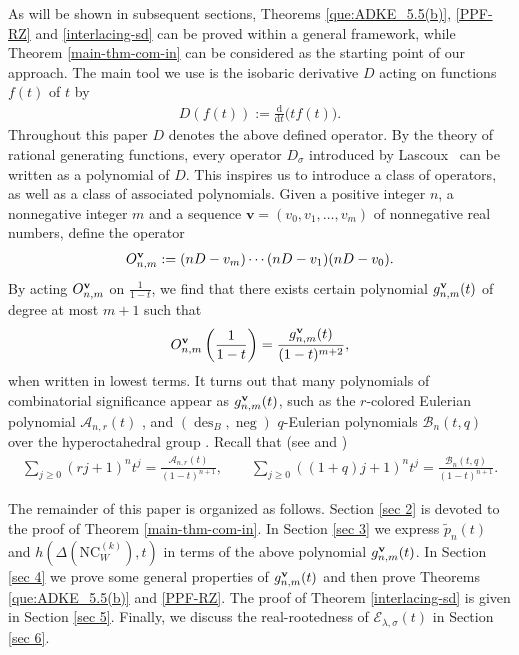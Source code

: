 \documentclass[12pt]{article}
\newcommand{\PPP}{\tilde{p}}
\newcommand{\NC}{\mathrm{NC}}
\numberwithin{equation}{section}
\begin{document}
As will be shown in subsequent sections, Theorems \ref{que:ADKE_5.5(b)}, \ref{PPF-RZ} and \ref{interlacing-sd} can be proved within a general framework, while Theorem \ref{main-thm-com-in} can be considered as the starting point of our approach. 
The main tool we use is the isobaric derivative $D$ acting on functions $f(t)$ of $t$ by 
\begin{align*}
D(f(t)):=\frac{\text{d}}{\text{d}t}\big(tf(t)\big).    
\end{align*}
Throughout this paper $D$ denotes the above defined operator. 
By the theory of rational generating functions, every operator $D_\sigma$ introduced by Lascoux~\cite{Lascoux-2016} 
can be written as a polynomial of $D$. This inspires us to introduce a class of operators, as well as a class of associated polynomials.  
Given a positive integer $n$, a nonnegative integer $m$ and a sequence $\mathbf{v} =(v_0,v_1,\ldots, v_{m})$ of nonnegative real numbers, 
define the operator
\begin{align}\label{eq:defi-O_nk}
O^{\bf{v}}_{n,m}:=(nD - v_m) \cdots(nD - v_1)(nD-v_0).
\end{align}
By acting $O^{\bf{v}}_{n,m}$ on $\frac{1}{1-t}$, we find that there exists certain polynomial $g^{\bf{v}}_{n,m}(t)$ of degree at most $m+1$ such that
\begin{align}\label{eq:defi-fnk(x)}
O^{\bf{v}}_{n,m} \left( \frac{1}{1 - t} \right)=
\frac{g^{\bf{v}}_{n,m}(t)}{(1 - t)^{m + 2}},
\end{align}
when written in lowest terms.
It turns out that many polynomials of combinatorial significance  appear as $g^{\bf{v}}_{n,m}(t)$, such as the $r$-colored Eulerian polynomial $\mathcal{A}_{n,r}(t)$ \cite{Steingrimsson-1994}, and $(\operatorname{des}_B,\operatorname{neg})$ $q$-Eulerian polynomials $\mathcal{B}_n(t,q)$ over the hyperoctahedral group \cite{Brenti-1994}.
Recall that (see \cite[Eq. (12)]{Brenti-1994} and \cite[Theorem 17]{Steingrimsson-1994}) 
\begin{align*}
\sum_{j\ge0}(rj+1)^n t^j=\frac{\mathcal{A}_{n,r}(t)}{(1-t)^{n+1}},\qquad\sum_{j\ge0}((1+q)j+1)^n t^j=\frac{\mathcal{B}_n(t,q)}{(1-t)^{n+1}}.
\end{align*}

The remainder of this paper is organized as follows. Section \ref{sec 2} is devoted to the proof of Theorem \ref{main-thm-com-in}. 
In Section \ref{sec 3} we express $\PPP_n(t)$ and $h(\Delta(\NC^{(k)}_W),t)$ in terms of the above polynomial $g^{\bf{v}}_{n,m}(t)$.
In Section \ref{sec 4} we prove some general properties of $g^{\bf{v}}_{n,m}(t)$ and then prove Theorems \ref{que:ADKE_5.5(b)} and \ref{PPF-RZ}. 
The proof of Theorem \ref{interlacing-sd} is given in Section \ref{sec 5}. Finally, we discuss the real-rootedness of $\mathcal{E}_{\lambda,\sigma}(t)$ in Section \ref{sec 6}.
\end{document}

